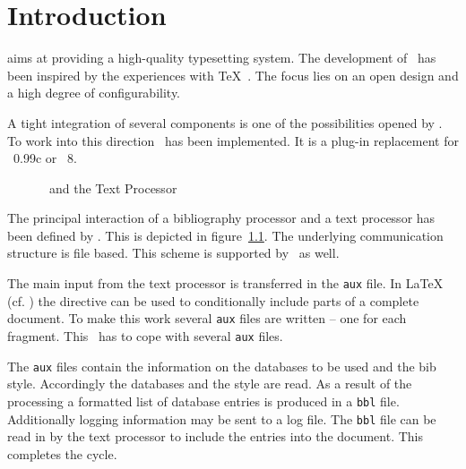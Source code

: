 
\chapter{Introduction}

\ExTeX{} aims at providing a high-quality
typesetting system. The development of \ExTeX\ has been inspired by
the experiences with \TeX\ \cite{knuth:texbook}. The focus lies on an
open design and a high degree of configurability.

A tight integration of several components is one of the possibilities
opened by \ExTeX. To work into this direction \ExBib\ has been
implemented. It is a plug-in replacement for
\BibTeX~0.99c\cite{btxdoc,btxhak}
or \BibTeX~8.

\begin{figure}[hb]
  \centering
  
  \caption{\ExBib\ and the Text Processor}%
  \label{fig:files}
\end{figure}
The principal interaction of a bibliography processor and a text
processor has been defined by
\BibTeX{}. This is depicted in
figure~\ref{fig:files}. The underlying communication structure is file
based. This scheme is supported by \ExBib\ as well.

The main input from the text processor is
transferred in the \texttt{aux} file. In \LaTeX{}
(cf. \cite{lamport:latex,goosens.mittelbach:latex.companion}) the
directive  can be used to conditionally include parts
of a complete document. To make this work several \texttt{aux} files
are written -- one for each fragment. This \ExBib\ has to cope with
several \texttt{aux} files.

The \texttt{aux} files contain the information on the databases to be
used and the bib style. Accordingly the databases and the style are
read. As a result of the processing a formatted list of database
entries is produced in a \texttt{bbl} file. Additionally logging
information may be sent to a log file. The \texttt{bbl} file can be
read in by the text processor to include the entries into the
document. This completes the cycle.

